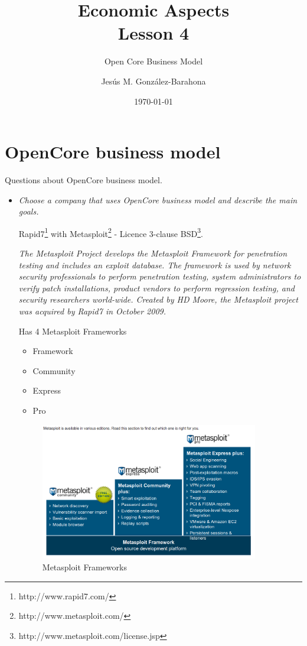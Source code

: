 \documentclass[11pt]{scrartcl}
\title{\textbf{Economic Aspects\\
                Lesson 4}}
\subtitle{Open Core Business Model}
\author{Jesús M. González-Barahona}
\date{\today}
\begin{document}
\maketitle

\section{OpenCore business model}

Questions about OpenCore business model.

\begin{itemize}

\item \emph{Choose a company that uses OpenCore business model and describe the main goals.}

    \par Rapid7\footnote{http://www.rapid7.com/} with Metasploit\footnote{http://www.metasploit.com/} - Licence 3-clause BSD\footnote{http://www.metasploit.com/license.jsp}.

    \emph{The Metasploit Project develops the Metasploit Framework for penetration testing and includes an exploit database. The framework is used by network security professionals to perform penetration testing, system administrators to verify patch installations, product vendors to perform regression testing, and security researchers world-wide. Created by HD Moore, the Metasploit project was acquired by Rapid7 in October 2009.}

    \par Has 4 Metasploit Frameworks

    \begin{itemize}
        \item Framework
        \item Community
        \item Express
        \item Pro
    \end{itemize}

    \begin{figure}[H]
        \begin{center}
            \includegraphics[width=0.9\textwidth]{images/metasploit-frameworks.png}
            \caption{Metasploit Frameworks}
            \label{fig:metasploit-fw}
        \end{center}
    \end{figure}


\end{itemize}
\end{document}
